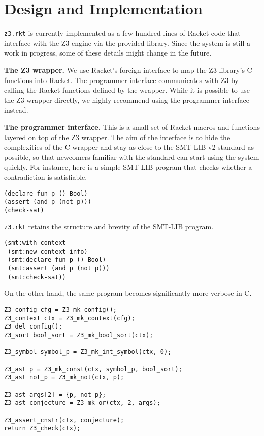 \section{Design and Implementation}

\texttt{z3.rkt} is currently implemented as a few hundred lines of Racket code
that interface with the Z3 engine via the provided library. Since the system is
still a work in progress, some of these details might change in the future.

\textbf{The Z3 wrapper.} We use Racket's foreign interface \cite{racket/foreign}
to map the Z3 library's C functions into Racket. The programmer interface
communicates with Z3 by calling the Racket functions defined by the
wrapper. While it is possible to use the Z3 wrapper directly, we highly
recommend using the programmer interface instead.

\textbf{The programmer interface.} This is a small set of Racket macros and
functions layered on top of the Z3 wrapper. The aim of the interface is to hide
the complexities of the C wrapper and stay as close to the SMT-LIB v2 standard
\cite{smtlib2:10} as possible, so that newcomers familiar with the standard can
start using the system quickly. For instance, here is a simple SMT-LIB program
that checks whether a contradiction is satisfiable.

\begin{verbatim}
(declare-fun p () Bool)
(assert (and p (not p)))
(check-sat)
\end{verbatim}

\texttt{z3.rkt} retains the structure and brevity of the SMT-LIB program.

\begin{verbatim}
(smt:with-context
 (smt:new-context-info)
 (smt:declare-fun p () Bool)
 (smt:assert (and p (not p)))
 (smt:check-sat))
\end{verbatim}

On the other hand, the same program becomes significantly more verbose in C.

\begin{verbatim}
Z3_config cfg = Z3_mk_config();
Z3_context ctx = Z3_mk_context(cfg);
Z3_del_config();
Z3_sort bool_sort = Z3_mk_bool_sort(ctx);

Z3_symbol symbol_p = Z3_mk_int_symbol(ctx, 0);

Z3_ast p = Z3_mk_const(ctx, symbol_p, bool_sort);
Z3_ast not_p = Z3_mk_not(ctx, p);

Z3_ast args[2] = {p, not_p};
Z3_ast conjecture = Z3_mk_or(ctx, 2, args);

Z3_assert_cnstr(ctx, conjecture);
return Z3_check(ctx);
\end{verbatim}

